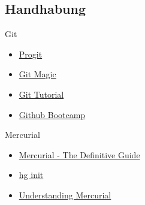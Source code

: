 \documentclass[presentation]{beamer}
\begin{document}
\subsection{Handhabung}
\begin{frame}{Git}
  \begin{itemize}
  \item<1-> \href{http://progit.org/book/}{Progit}
  \item<2-> \href{http://www-cs-students.stanford.edu/~blynn/gitmagic/}{Git Magic}
  \item<3-> \href{http://www.kernel.org/pub/software/scm/git/docs/gittutorial.html}{Git Tutorial} 
  \item<4-> \href{http://help.github.com/}{Github Bootcamp}
  \end{itemize}
\end{frame}
\begin{frame}{Mercurial}
  \begin{itemize}
  \item<1-> \href{http://hgbook.red-bean.com/}{Mercurial - The Definitive Guide}
  \item<2-> \href{http://hginit.com/}{hg init}
  \item<3-> \href{http://mercurial.selenic.com/wiki/UnderstandingMercurial}{Understanding Mercurial}
  \end{itemize}
\end{frame}
\end{document}
